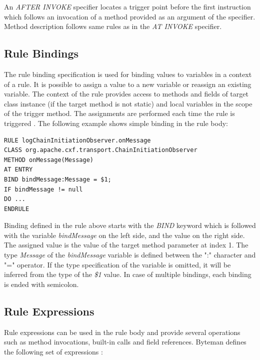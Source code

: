 \documentclass[12pt,oneside]{fithesis2}
\begin{document}
An \textit{AFTER INVOKE} specifier locates a trigger point before the first instruction which follows an invocation of a method provided as an argument of the specifier. Method description follows same rules as in the \textit{AT INVOKE} specifier.

\subsection{Rule Bindings}
\label{subsec:rule_bindings}
The rule binding specification is used for binding values to variables in a context of a rule. It is possible to assign a value to a new variable or reassign an existing variable. The context of the rule provides access to methods and fields of target class instance (if the target method is not static) and local variables in the scope of the trigger method. The assignments are performed each time the rule is triggered \cite[Rule Bindings]{byteman_doc}. The following example shows simple binding in the rule body: 

\begin{lstlisting}[caption = Rule binding specification, label = rule_binding_code]
RULE logChainInitiationObserver.onMessage
CLASS org.apache.cxf.transport.ChainInitiationObserver
METHOD onMessage(Message)
AT ENTRY
BIND bindMessage:Message = $1;
IF bindMessage != null
DO ...
ENDRULE
\end{lstlisting}

Binding defined in the rule above starts with the \textit{BIND} keyword which is followed with the variable \textit{bindMessage} on the left side, and the value on the right side. The assigned value is the value of the target method parameter at index 1. The type \textit{Message} of the \textit{bindMessage} variable is defined between the ":" character and "=" operator. If the type specification of the variable is omitted, it will be inferred from the type of the \textit{\$1} value. In case of multiple bindings, each binding is ended with semicolon.

\subsection{Rule Expressions}
\label{subsec:rule_exp}
Rule expressions can be used in the rule body and provide several operations such as method invocations, built-in calls and field references. Byteman defines the following set of expressions \cite[Rule Expressions]{byteman_doc}:
\end{document}
